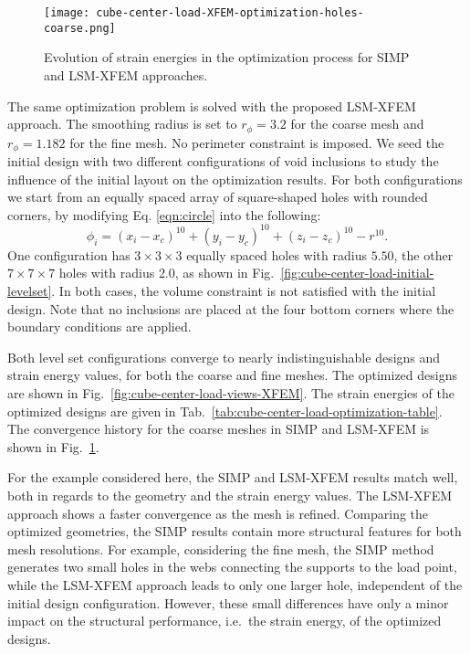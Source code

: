 %
\begin{figure}
	\centering
	\texttt{[image: cube-center-load-XFEM-optimization-holes-coarse.png]}
	\caption{Evolution of strain energies in the optimization process for SIMP and LSM-XFEM approaches.}
	\label{fig:cube-center-load-XFEM-optimization-holes-coarse}
\end{figure}
%
The same optimization problem is solved with the proposed LSM-XFEM approach. The smoothing radius is set to $r_\phi = 3.2$ for the coarse mesh and $r_\phi = 1.182$ for the fine mesh. No perimeter constraint is imposed. We seed the initial design with two different configurations of void inclusions to study the influence of the initial layout on the optimization results. For both configurations we start from an equally spaced array of square-shaped holes with rounded corners, by modifying Eq. \ref{eqn:circle} into the following:
%
\begin{equation}
	\label{eqn:squircle}
	\phi_i = { (x_i - x_c) }^{10} + { (y_i - y_c) }^{10} + { (z_i - z_c) }^{10} - r^{10}.
\end{equation}
%
One configuration has $3 \times 3 \times 3$ equally spaced holes with radius $5.50$, the other $7 \times 7 \times 7$ holes with radius $2.0$, as shown in Fig.~\ref{fig:cube-center-load-initial-levelset}. In both cases, the volume constraint is not satisfied with the initial design. Note that no inclusions are placed at the four bottom corners where the boundary conditions are applied.

Both level set configurations converge to nearly indistinguishable designs and strain energy values, for both the coarse and fine meshes. The optimized designs are shown in Fig.~\ref{fig:cube-center-load-views-XFEM}. The strain energies of the optimized designs are given in Tab.~\ref{tab:cube-center-load-optimization-table}. The convergence history for the coarse meshes in SIMP and LSM-XFEM is shown in Fig.~\ref{fig:cube-center-load-XFEM-optimization-holes-coarse}.

For the example considered here, the SIMP and LSM-XFEM results match well, both in regards to the geometry and the strain energy values. The LSM-XFEM approach shows a faster convergence as the mesh is refined. Comparing the optimized geometries, the SIMP results contain more structural features for both mesh resolutions. For example, considering the fine mesh, the SIMP method generates two small holes in the webs connecting the supports to the load point, while the LSM-XFEM approach leads to only one larger hole, independent of the initial design configuration. However, these small differences have only a minor impact on the structural performance, i.e.~the strain energy, of the optimized designs.

